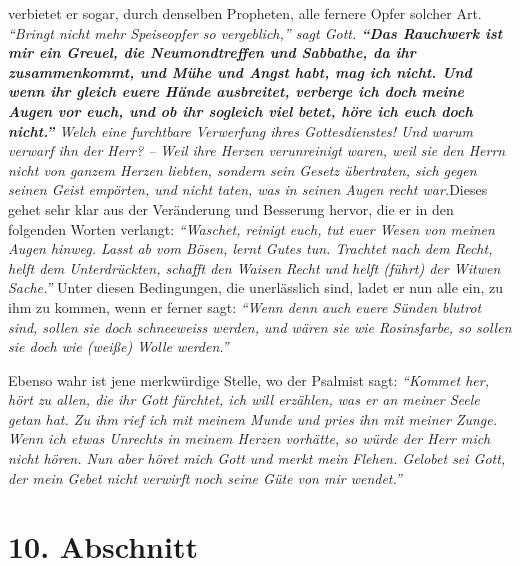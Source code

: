 verbietet
er sogar, durch denselben Propheten, alle fernere Opfer solcher Art.
\textit{\textit{"`Bringt nicht mehr Speiseopfer so vergeblich,"'} sagt Gott.
\label{ref:06_09_gebetserhoerung}
\textbf{"`Das Rauchwerk ist mir ein Greuel, die Neumondtreffen und Sabbathe, da
ihr
zusammenkommt, und Mühe und Angst habt, mag ich nicht. Und wenn ihr gleich euere
Hände ausbreitet, verberge ich doch meine Augen vor euch, und ob ihr sogleich
viel
betet, höre ich euch doch nicht."'}
Welch eine
furchtbare Verwerfung ihres Gottesdienstes! Und warum verwarf ihn der Herr? --
Weil ihre Herzen verunreinigt waren, weil sie den Herrn nicht von ganzem Herzen
liebten, sondern sein Gesetz übertraten, sich gegen seinen Geist empörten, und
nicht taten, was in seinen Augen recht war.}Dieses gehet sehr klar aus der
Veränderung und Besserung hervor, die er in den folgenden Worten verlangt:
\textit{"`Waschet, reinigt euch, tut euer Wesen von meinen Augen hinweg. Lasst
ab vom
Bösen, lernt Gutes tun. Trachtet nach dem Recht, helft dem Unterdrückten,
schafft den Waisen Recht und helft (führt) der Witwen Sache."'}
Unter diesen Bedingungen, die unerlässlich sind, ladet er nun alle ein,
zu ihm zu kommen, wenn er ferner sagt:
\textit{"`Wenn denn auch euere Sünden blutrot
sind, sollen sie doch schneeweiss werden, und wären sie wie Rosinsfarbe, so
sollen sie doch wie (weiße) Wolle werden."'}

\medskip

Ebenso wahr ist jene merkwürdige Stelle, wo der Psalmist sagt:
\textit{"`Kommet her,
hört zu allen, die ihr Gott fürchtet, ich will erzählen, was er an meiner Seele
getan hat. Zu ihm rief ich mit meinem Munde und pries ihn mit meiner Zunge.
Wenn ich etwas Unrechts in meinem Herzen vorhätte, so würde der Herr mich nicht
hören. Nun aber höret mich Gott und merkt mein Flehen. Gelobet sei Gott,
der mein Gebet nicht verwirft noch seine Güte von mir wendet."'}

\section{10. Abschnitt} \label{kap6_ab10}

